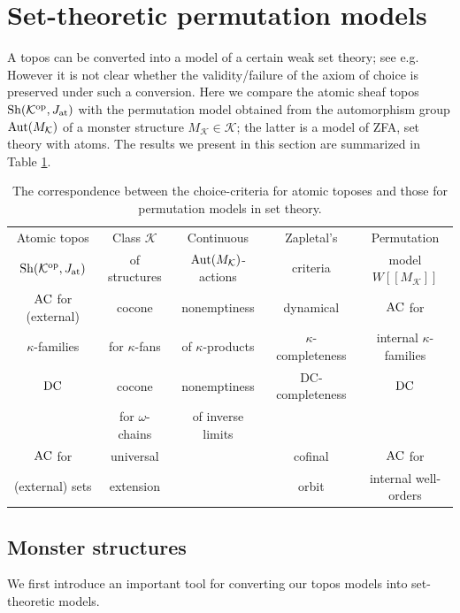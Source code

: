 \documentclass[10pt]{amsart}
\numberwithin{equation}{section}
\theoremstyle{plain}
\theoremstyle{definition}
\newcommand{\om}{\omega}
\newcommand{\K}{\mathcal{K}}
\begin{document}
\section{Set-theoretic permutation models}\label{sec:set-theory}

A topos can be converted into a model of a certain weak set theory; see e.g.~\cite{BlSc89}
However it is not clear whether the validity/failure of the axiom of choice is preserved under such a conversion.
Here we compare the atomic sheaf topos ${\rm Sh}(\K^{\rm op},J_{\rm at})$ with the permutation model obtained from the automorphism group ${\rm Aut}(M_\K)$ of a monster structure $M_\K\in\K$; the latter is a model of ZFA, set theory with atoms.
The results we present in this section are summarized in Table \ref{table-2}.

\begin{table}[t]\centering\footnotesize
\begin{tabular}{ccccc}
Atomic topos& Class $\mathcal{K}$ & Continuous  &  Zapletal's & Permutation  \\
${\rm Sh}(\K^{\rm op},J_{\rm at})$ & of structures & ${\rm Aut}(M_\K)$-actions & criteria \cite{Zap26}  & model $W[[M_\K]]$ \\ \hline
${\rm AC}$ for (external)  & cocone & nonemptiness & dynamical &${\rm AC}$ for  \\
$\kappa$-families &  for $\kappa$-fans & of $\kappa$-products &  $\kappa$-completeness & internal $\kappa$-families \\[0.5em]
${\rm DC}$ & cocone & nonemptiness & DC-completeness &${\rm DC}$  \\
&  for $\om$-chains & of inverse limits &   & \\[0.5em]
${\rm AC}$ for & universal & & cofinal &${\rm AC}$ for  \\
(external) sets & extension & & orbit & internal well-orders \\[1em]
\end{tabular}
\caption{\small The correspondence between the choice-criteria for atomic toposes and those for permutation models in set theory.}\label{table-2}
\end{table}



\subsection{Monster structures}

We first introduce an important tool for converting our topos models into set-theoretic models.
\end{document}
